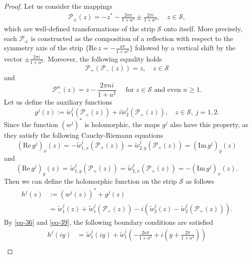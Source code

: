 \documentclass[11pt, letterpaper, reqno]{amsart}
\numberwithin{equation}{section}
\theoremstyle{definition}
\theoremstyle{plain}
\numberwithin{equation}{section}
\def\PP{\mathcal{P}}
\def\SS{\mathcal{S}}
\begin{document}
\begin{proof}
Let us consider the mappings 
\begin{align*}
\PP_{\pm}(z) = -z^{*} - \frac{2a\pi}{1+a^2} \pm \frac{2\pi i}{1+a^2}, \quad z\in\SS, 
\end{align*}
which are well-defined transformations of the strip $\SS$ onto itself. More precisely, each $\PP_{\pm}$ is constructed as the composition of a reflection with respect to the symmetry axis of the strip $\{\mathrm{Re}\,z = - \tfrac{a\pi}{1+a^2}\}$ followed by a vertical shift by the vector $\pm\tfrac{2\pi i}{1+a^2}$. Moreover, the following equality holds 
\begin{equation}\label{eq-p1}
\PP_{+}(\PP_{-}(z)) = z, \quad z\in\SS
\end{equation}
and 
\begin{equation}\label{eq-p2}
\PP_{-}^{n}(z) = z - \frac{2\pi n i}{1+a^2} \quad \text{ for } z\in\SS\text{ and even } n\ge 1.
\end{equation}
Let us define the auxiliary functions $$g^j(z) := \tilde{w}_{1}^j(\PP_{+}(z)) + i\tilde{w}_{2}^j(\PP_{+}(z)), \quad z\in\SS, \ j=1,2.$$ 
Since the function $(w^{j})^{*}$ is holomorphic, the maps $g^j$ also have this property, as they satisfy the following Cauchy-Riemann equations 
\begin{equation*}
(\mathrm{Re}\, g^{j})_{x}(z) = -\tilde{w}_{1,x}^j(\PP_{+}(z)) = \tilde{w}_{2,y}^j(\PP_{+}(z)) = (\mathrm{Im}\, g^{j})_{y}(z)
\end{equation*}
and
\begin{equation*}
(\mathrm{Re}\, g^{j})_{y}(z) = \tilde{w}_{1,y}^j(\PP_{+}(z)) = \tilde{w}_{2,x}^j(\PP_{+}(z)) = -(\mathrm{Im}\, g^{j})_{x}(z).
\end{equation*}
Then we can define the holomorphic function on the strip $\SS$ as follows
\begin{equation*}
\begin{aligned}
h^j(z) & := (w^j(z))^{*} + g^j(z) \\
& = \tilde{w}_{1}^j(z) + \tilde{w}_{1}^j(\PP_{+}(z)) - i \left(\tilde{w}_{2}^j(z) - \tilde{w}_{2}^j(\PP_{+}(z))\right).
\end{aligned}
\end{equation*}
By \eqref{eq-36} and \eqref{eq-39}, the following boundary conditions are satisfied 
\begin{equation}
\begin{aligned}\label{eq-50}
h^j(iy) &= \tilde{w}_{1}^j(iy) + \tilde{w}_{1}^j\left(-\frac{2a\pi}{1+a^2}+ i\left(y + \frac{2\pi}{1+a^2}\right)\right) \\

\end{aligned}
\end{equation}
\end{proof}
\end{document}
